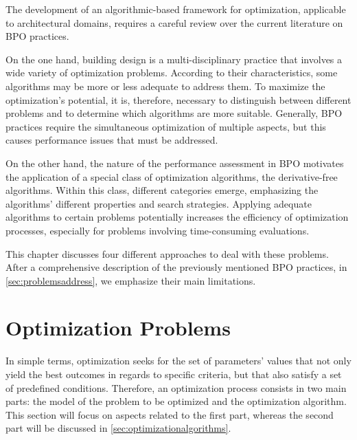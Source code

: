 \label{chap:back}

The development of an algorithmic-based framework for optimization, applicable to architectural domains, requires a careful review over the current literature on \ac{BPO} practices.
	
On the one hand, building design is a multi-disciplinary practice that involves a wide variety of optimization problems. According to their characteristics, some algorithms may be more or less adequate to address them. To maximize the optimization's potential, it is, therefore, necessary to distinguish between different problems and to determine which algorithms are more suitable. Generally, \ac{BPO} practices require the simultaneous optimization of multiple aspects, but this causes performance issues that must be addressed. 
	
On the other hand, the nature of the performance assessment in \ac{BPO} motivates the application of a special class of optimization algorithms, the derivative-free algorithms. Within this class, different categories emerge, emphasizing the algorithms' different properties and search strategies. Applying adequate algorithms to certain problems potentially increases the efficiency of optimization processes, especially for problems involving time-consuming evaluations.
	
This chapter discusses four different approaches to deal with these problems. After a comprehensive description of the previously mentioned \ac{BPO} practices, in \cref{sec:problemsaddress}, we emphasize their main limitations. 
	
\section{Optimization Problems}
\label{sec:optimizationproblems}	
In simple terms, optimization seeks for the set of parameters' values that not only yield the best outcomes in regards to specific criteria, but that also satisfy a set of predefined conditions. Therefore, an optimization process consists in two main parts: the model of the problem to be optimized and the optimization algorithm. This section  will focus on aspects related to the first part, whereas the second part will be discussed in \cref{sec:optimizationalgorithms}.
	
